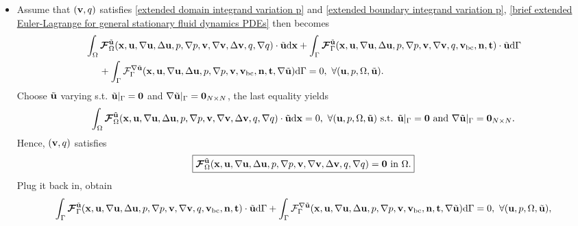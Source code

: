 \documentclass[oneside,11pt]{book}
\numberwithin{equation}{section}
\begin{document}
\begin{itemize}[leftmargin=0in]
\begin{itemize}
        \item Assume that $({\bf v},q)$ satisfies \eqref{extended domain integrand variation p} and \eqref{extended boundary integrand variation p}, \eqref{brief extended Euler-Lagrange for general stationary fluid dynamics PDEs} then becomes
        \begin{align*}
            &\int_\Omega \boldsymbol{\mathcal{F}}_\Omega^{\tilde{\bf u}}({\bf x},{\bf u},\nabla{\bf u},\Delta{\bf u},p,\nabla p,{\bf v},\nabla{\bf v},\Delta{\bf v},q,\nabla q)\cdot\tilde{\bf u}{\rm d}{\bf x} + \int_\Gamma \boldsymbol{\mathcal{F}}_\Gamma^{\tilde{\bf u}}({\bf x},{\bf u},\nabla{\bf u},\Delta{\bf u},p,\nabla p,{\bf v},\nabla{\bf v},q,{\bf v}_{\rm bc},{\bf n},{\bf t})\cdot\tilde{\bf u}{\rm d}\Gamma\\
            &\hspace{5mm}+ \int_\Gamma \mathcal{F}_\Gamma^{\nabla\tilde{\bf u}}({\bf x},{\bf u},\nabla{\bf u},\Delta{\bf u},p,\nabla p,{\bf v},{\bf v}_{\rm bc},{\bf n},{\bf t},\nabla\tilde{\bf u}){\rm d}\Gamma = 0,\ \forall({\bf u},p,\Omega,\tilde{\bf u}).
        \end{align*}
        Choose $\tilde{\bf u}$ varying s.t. $\tilde{\bf u}|_\Gamma = {\bf 0}$ and $\nabla\tilde{\bf u}|_\Gamma = {\bf 0}_{N\times N}$, the last equality yields
        \begin{align*}
            \int_\Omega \boldsymbol{\mathcal{F}}_\Omega^{\tilde{\bf u}}({\bf x},{\bf u},\nabla{\bf u},\Delta{\bf u},p,\nabla p,{\bf v},\nabla{\bf v},\Delta{\bf v},q,\nabla q)\cdot\tilde{\bf u}{\rm d}{\bf x} = 0,\ \forall({\bf u},p,\Omega,\tilde{\bf u}) \mbox{ s.t. } \tilde{\bf u}|_\Gamma = {\bf 0} \mbox{ and } \nabla\tilde{\bf u}|_\Gamma = {\bf 0}_{N\times N}.
        \end{align*}
        Hence, $({\bf v},q)$ satisfies
        \begin{align*}
            \boxed{\boldsymbol{\mathcal{F}}_\Omega^{\tilde{\bf u}}({\bf x},{\bf u},\nabla{\bf u},\Delta{\bf u},p,\nabla p,{\bf v},\nabla{\bf v},\Delta{\bf v},q,\nabla q) = {\bf 0} \mbox{ in } \Omega.}
        \end{align*}
        Plug it back in, obtain
        \begin{align*}
            \int_\Gamma \boldsymbol{\mathcal{F}}_\Gamma^{\tilde{\bf u}}({\bf x},{\bf u},\nabla{\bf u},\Delta{\bf u},p,\nabla p,{\bf v},\nabla{\bf v},q,{\bf v}_{\rm bc},{\bf n},{\bf t})\cdot\tilde{\bf u}{\rm d}\Gamma + \int_\Gamma \mathcal{F}_\Gamma^{\nabla\tilde{\bf u}}({\bf x},{\bf u},\nabla{\bf u},\Delta{\bf u},p,\nabla p,{\bf v},{\bf v}_{\rm bc},{\bf n},{\bf t},\nabla\tilde{\bf u}){\rm d}\Gamma = 0,\ \forall({\bf u},p,\Omega,\tilde{\bf u}),

\end{align*}
\end{itemize}
\end{itemize}
\end{document}
